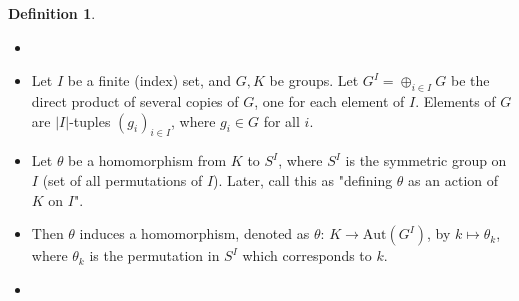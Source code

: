 \documentclass{book}
\newcommand{\abs}[1]{\lvert #1 \rvert }
\newcommand{\Aut}[1]{\textrm{Aut}( #1 )}
\theoremstyle{definition}
\newtheorem{definition}[lemma]{Definition}
\theoremstyle{remarkstyle}
\begin{document}
\begin{definition}
\begin{itemize}
    \item[] 
    \item Let $I$ be a finite (index) set, and $G,K$ be groups. Let $G^{I} = \oplus_{i\in I}G $ be the direct product of several copies of $G$, one for each element of $I$. Elements of $G$ are $\abs{I}$-tuples $(g_{i})_{i\in I} $, where $g_{i} \in G $ for all $i$. 
    \item Let $\theta$ be a homomorphism from $K$ to $S^{I} $, where $S^{I} $ is the symmetric group on $I$ (set of all permutations of $I$). Later, call this as "defining $\theta$ as an action of $K$ on $I$".
    \item Then $\theta$ induces a homomorphism, denoted as $\theta: \, K \rightarrow \Aut{G^{I}} $, by $k \mapsto \theta_{k} $, where $\theta_{k}$ is the permutation in $S^{I} $ which corresponds to $k$.
    \item[] 
\end{itemize}
\end{definition}
\end{document}
